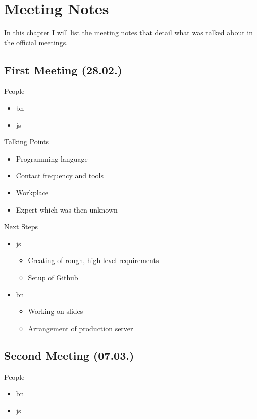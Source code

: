 \chapter{Meeting Notes}
\label{sec:meeting:notes}

In this chapter I will list the meeting notes that detail what was talked about in the official meetings.

\section{First Meeting (28.02.)}
\label{sec:meeting01}

People
\begin{itemize}
    \item \gls{bn}
    \item \gls{js}
\end{itemize}

Talking Points
\begin{itemize}
    \item Programming language
    \item Contact frequency and tools
    \item Workplace
    \item Expert which was then unknown
\end{itemize}

Next Steps
\begin{itemize}
    \item \gls{js}
    \begin{itemize}
        \item Creating of rough, high level requirements
        \item Setup of Github 
    \end{itemize}
    \item \gls{bn}
    \begin{itemize}
        \item Working on slides
        \item Arrangement of production server
    \end{itemize}
\end{itemize}

\section{Second Meeting (07.03.)}
\label{sec:meeting02}

People
\begin{itemize}
    \item \gls{bn}
    \item \gls{js}
\end{itemize}

